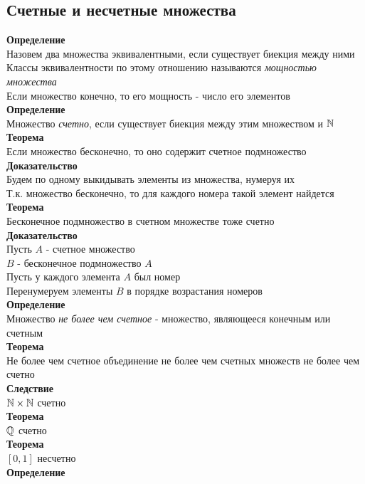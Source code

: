 \documentclass[12pt]{article}
\begin{document}
\subsection{Счетные и несчетные множества}
\textbf{Определение}\\
Назовем два множества эквивалентными, если существует биекция между ними\\
Классы эквивалентности по этому отношению называются \textit{мощностью множества}\\
Если множество конечно, то его мощность - число его элементов\\
\textbf{Определение}\\
Множество \textit{счетно}, если существует биекция между этим множеством и $\mathbb{N}$\\
\textbf{Теорема}\\
Если множество бесконечно, то оно содержит счетное подмножество\\
\textbf{Доказательство}\\
Будем по одному выкидывать элементы из множества, нумеруя их\\
Т.к. множество бесконечно, то для каждого номера такой элемент найдется\\
\textbf{Теорема}\\
Бесконечное подмножество в счетном множестве тоже счетно\\
\textbf{Доказательство}\\
Пусть $A$ - счетное множество\\
$B$ - бесконечное подмножество $A$\\
Пусть у каждого элемента $A$ был номер\\
Перенумеруем элементы $B$ в порядке возрастания номеров\\
\textbf{Определение}\\
Множество \textit{не более чем счетное} - множество, являющееся конечным или счетным\\
\textbf{Теорема}\\
Не более чем счетное объединение не более чем счетных множеств не более чем счетно\\
\textbf{Следствие}\\
$\mathbb{N} \times \mathbb{N}$ счетно\\
\textbf{Теорема}\\
$\mathbb{Q}$ счетно\\
\textbf{Теорема}\\
$[0, 1]$ несчетно\\
\textbf{Определение}\\
\end{document}
